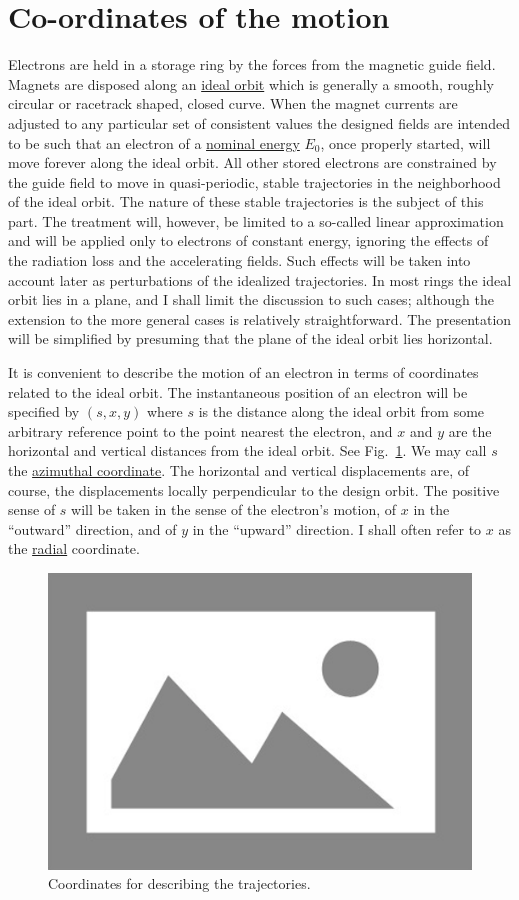 \section{Co-ordinates of the motion} \label{sec:2.1}
Electrons are held in a storage ring by the forces from the magnetic guide field. Magnets are disposed along an \underline{ideal orbit} which is generally a smooth, roughly circular or racetrack shaped, closed curve. When the magnet currents are adjusted to any particular set of consistent values the designed fields are intended to be such that an electron of a \underline{nominal energy} $E_0$, once properly started, will move forever along the ideal orbit. All other stored electrons are constrained by the guide field to move in quasi-periodic, stable trajectories in the neighborhood of the ideal orbit. The nature of these stable trajectories is the subject of this part. The treatment will, however, be limited to a so-called linear approximation and will be applied only to electrons of constant energy, ignoring the effects of the radiation loss and the accelerating fields. Such effects will be taken into account later as perturbations of the idealized trajectories. In most rings the ideal orbit lies in a plane, and I shall limit the discussion to such cases; although the extension to the more general cases is relatively straightforward. The presentation will be simplified by presuming that the plane of the ideal orbit lies horizontal.

It is convenient to describe the motion of an electron in terms of coordinates related to the ideal orbit. The instantaneous position of an electron will be specified by $(s, x, y)$ where $s$ is the distance along the ideal orbit from some arbitrary reference point to the point nearest the electron, and $x$ and $y$ are the horizontal and vertical distances from the ideal orbit. See Fig.~\ref{fig:fig7}. We may call $s$ the \underline{azimuthal coordinate}. The horizontal and vertical displacements are, of course, the displacements locally perpendicular to the design orbit. The positive sense of $s$ will be taken in the sense of the electron’s motion, of $x$ in the “outward” direction, and of $y$ in the “upward” direction. I shall often refer to $x$ as the \underline{radial} coordinate.

\begin{figure}[!htb]
	\centering
	\includegraphics[width=0.6\linewidth]{./Figuras/placeholder.png}
	\caption{Coordinates for describing the trajectories.}
	\label{fig:fig7}
\end{figure}

